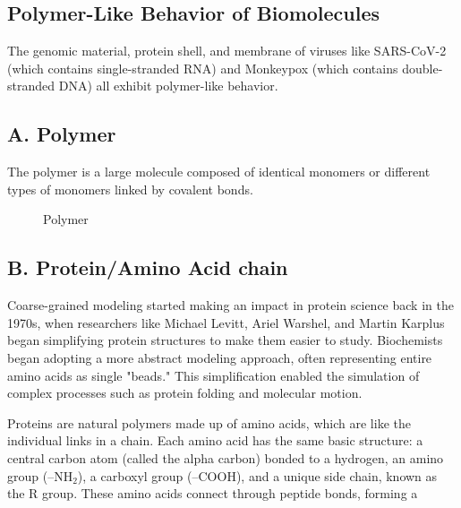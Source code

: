 \documentclass[12pt]{article}
\begin{document}
\begin{flushleft}
	
	
	
	
\vspace{-1em} 
\section*{Polymer-Like Behavior of Biomolecules} 
 The genomic material, protein shell, and membrane of viruses like SARS-CoV-2 (which contains single-stranded RNA) and Monkeypox (which contains double-stranded DNA) all exhibit polymer-like behavior.


\vspace{-1em}
\subsection*{A. Polymer}
The polymer is a large molecule composed of identical monomers or different types of monomers linked by covalent bonds\cite {Everaers2020}. 

\begin{figure}[!ht]
  \centering
  
  \caption{Polymer}
\end{figure}






\vspace{-1em} 




\vspace{-2em} 
\subsection*{B. Protein/Amino Acid chain}
Coarse-grained modeling started making an impact in protein science back in the 1970s, when researchers like Michael Levitt, Ariel Warshel, and Martin Karplus began simplifying protein structures to make them easier to study.
Biochemists began adopting a more abstract modeling approach, often representing entire amino acids as single "beads." This simplification enabled the simulation of complex processes such as protein folding and molecular motion.

Proteins are natural polymers made up of amino acids, which are like the individual links in a chain. Each amino acid has the same basic structure: a central carbon atom (called the alpha carbon) bonded to a hydrogen, an amino group (–NH$_2$), a carboxyl group (–COOH), and a unique side chain, known as the R group. These amino acids connect through peptide bonds, forming a 


\end{flushleft}
\end{document}
